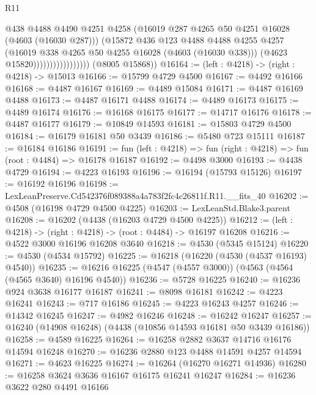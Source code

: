 \begin{lexlean}{R11}
\begin{coremodule}
                                    @438
                                    @4488
                                    @4490
                                    @4251
                                    @4258
                                    (@16019 @287 @4265 @50 @4251 @16028 (@4603 (@16030 @287)))
                                    (@15872
                                      @436
                                      @123
                                      @4488
                                      @4488
                                      @4255
                                      @4257
                                      (@16019 @338 @4265 @50 @4255 @16028 (@4603 (@16030 @338)))
                                      (@4623 @15820)))))))))))))))))
      (@8005 @15868))
@16164 := (left : @4218) -> (right : @4218) -> @15013
@16166 := @15799 @4729 @4500
@16167 := @4492 @16166
@16168 := @4487 @16167
@16169 := @4489 @15084
@16171 := @4487 @16169 @4488
@16173 := @4487 @16171 @4488
@16174 := @4489 @16173
@16175 := @4489 @16174
@16176 := @16168 @16175
@16177 := @14717 @16176
@16178 := @4487 @16177
@16179 := @10849 @14593
@16181 := @15803 @4729 @4500
@16184 := @16179 @16181 @50 @3439
@16186 := @5480 @723 @15111
@16187 := @16184 @16186
@16191 := fun (left : @4218) => fun (right : @4218) => fun (root : @4484) => @16178 @16187
@16192 := @4498 @3000
@16193 := @4438 @4729
@16194 := @4223 @16193
@16196 := @16194 (@15793 @15126)
@16197 := @16192 @16196
@16198 := LexLeanPreserve.Cd542376f089388a4a783f2fc4c26811f.R11.__fits_40
@16202 := @4508 (@16198 @4729 @4500 @4225)
@16203 := LexLeanStd.Blake3.parent
@16208 := @16202 (@4438 (@16203 @4729 @4500 @4225))
@16212 := (left : @4218) -> (right : @4218) -> (root : @4484) -> @16197 @16208
@16216 := @4522 @3000 @16196 @16208 @3640
@16218 := @4530 (@5345 @15124)
@16220 := @4530 (@4534 @15792)
@16225 := @16218 (@16220 (@4530 (@4537 @16193) @4540))
@16235 := @16216 @16225 (@4547 (@4557 @3000)) (@4563 (@4564 (@4565 @3640) @16196 @4540))
@16236 := @5728 @16225
@16240 := @16236 @924 @3638 @16177 @16187
@16241 := @8098 @16181
@16242 := @4223 @16241
@16243 := @717 @16186
@16245 := @4223 @16243 @4257
@16246 := @14342 @16245
@16247 := @4982 @16246
@16248 := @16242 @16247
@16257 := @16240 (@14908 @16248) (@4438 (@10856 @14593 @16181 @50 @3439 @16186))
@16258 := @4589 @16225
@16264 := @16258 @2882 @3637 @14716 @16176 @14594 @16248
@16270 := @16236 @2880 @123 @4488 @14591 @4257 @14594
@16271 := @4623 @16225
@16274 := @16264 (@16270 @16271 @14936)
@16280 := @16258 @3624 @3636 @16167 @16175 @16241 @16247
@16284 := @16236 @3622 @280 @4491 @16166

\end{coremodule}
\end{lexlean}
